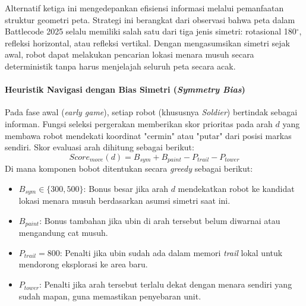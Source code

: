 Alternatif ketiga ini mengedepankan efisiensi informasi melalui pemanfaatan struktur geometri peta. Strategi ini berangkat dari observasi bahwa peta dalam Battlecode 2025 selalu memiliki salah satu dari tiga jenis simetri: rotasional 180$^\circ$, refleksi horizontal, atau refleksi vertikal. Dengan mengasumsikan simetri sejak awal, robot dapat melakukan pencarian lokasi menara musuh secara deterministik tanpa harus menjelajah seluruh peta secara acak.

\paragraph{Heuristik Navigasi dengan Bias Simetri (\textit{Symmetry Bias})}
Pada fase awal (\textit{early game}), setiap robot (khususnya \textit{Soldier}) bertindak sebagai informan. Fungsi seleksi pergerakan memberikan skor prioritas pada arah $d$ yang membawa robot mendekati koordinat "cermin" atau "putar" dari posisi markas sendiri. Skor evaluasi arah dihitung sebagai berikut:
\begin{equation}
    Score_{move}(d) = B_{sym} + B_{paint} - P_{trail} - P_{tower}
\end{equation}
Di mana komponen bobot ditentukan secara \textit{greedy} sebagai berikut:
\begin{itemize}
    \item $B_{sym} \in \{300, 500\}$: Bonus besar jika arah $d$ mendekatkan robot ke kandidat lokasi menara musuh berdasarkan asumsi simetri saat ini.
    \item $B_{paint}$: Bonus tambahan jika ubin di arah tersebut belum diwarnai atau mengandung cat musuh.
    \item $P_{trail} = 800$: Penalti jika ubin sudah ada dalam memori \textit{trail} lokal untuk mendorong eksplorasi ke area baru.
    \item $P_{tower}$: Penalti jika arah tersebut terlalu dekat dengan menara sendiri yang sudah mapan, guna memastikan penyebaran unit.
\end{itemize}

